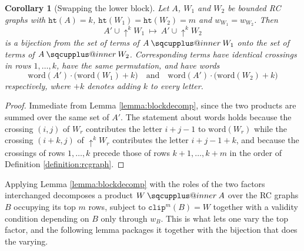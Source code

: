 \documentclass{amsart}
\makeatletter
\newcommand{\sqcupplus@inner}[2]{%
  \vcenter{\hbox{\ooalign{%
    \hfil$\m@th#1\sqcup$\hfil\cr
    \hfil\raisebox{0.15ex}{$\m@th#1\scriptscriptstyle+$}\hfil\cr
  }}}%
}
\newcommand{\sqcupplus}{\mathbin{\mathpalette\sqcupplus@inner\relax}}
\newtheorem{corollary}[lemma]{Corollary}
\theoremstyle{definition}
\theoremstyle{remark}
\numberwithin{equation}{subsection}
\newcommand{\shup}{{\uparrow}}
\newcommand{\wof}[1]{w_{#1}}
\newcommand{\hr}{\mathtt{ht}}
\newcommand{\clp}{\mathtt{clip}}
\makeatother
\begin{document}
\begin{corollary}[Swapping the lower block]\label{corollary:blockswap}
Let $A$, $W_1$ and $W_2$ be bounded RC graphs with $\hr(A)=k$, $\hr(W_1)=\hr(W_2)=m$ and $\wof{W_1}=\wof{W_2}$. Then
$$A'\cup\shup^{k}W_1\ \longmapsto\ A'\cup\shup^{k}W_2$$
is a bijection from the set of terms of $A\sqcupplus W_1$ onto the set of terms of $A\sqcupplus W_2$. Corresponding terms have identical crossings in rows $1,\ldots,k$, have the same permutation, and have words
$$\mathrm{word}(A')\cdot\bigl(\mathrm{word}(W_1)+k\bigr)\quad\text{and}\quad \mathrm{word}(A')\cdot\bigl(\mathrm{word}(W_2)+k\bigr)$$
respectively, where $+k$ denotes adding $k$ to every letter.
\end{corollary}
\begin{proof}
Immediate from Lemma \ref{lemma:blockdecomp}, since the two products are summed over the same set of $A'$. The statement about words holds because the crossing $(i,j)$ of $W_r$ contributes the letter $i+j-1$ to $\mathrm{word}(W_r)$ while the crossing $(i+k,j)$ of $\shup^{k}W_r$ contributes the letter $i+j-1+k$, and because the crossings of rows $1,\ldots,k$ precede those of rows $k+1,\ldots,k+m$ in the order of Definition \ref{definition:rcgraph}.
\end{proof}

Applying Lemma \ref{lemma:blockdecomp} with the roles of the two factors interchanged decomposes a product $W\sqcupplus A$ over the RC graphs $B$ occupying its top $m$ rows, subject to $\clp^{m}(B)=W$ together with a validity condition depending on $B$ only through $\wof B$. This is what lets one vary the top factor, and the following lemma packages it together with the bijection that does the varying.
\end{document}
